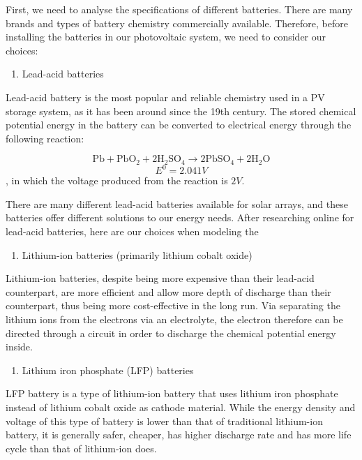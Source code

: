 First, we need to analyse the specifications of different batteries. There are many brands and types of battery chemistry commercially available. Therefore, before installing the batteries in our photovoltaic system, we need to consider our choices:
\begin{enumerate}
    \item Lead-acid batteries
\end{enumerate}
Lead-acid battery is the most popular and reliable chemistry used in a PV storage system, as it has been around since the 19th century. The stored chemical potential energy in the battery can be converted to electrical energy through the following reaction:

$$\mathrm{Pb}+\mathrm{PbO}_{2}+2 \mathrm{H}_{2} \mathrm{SO}_{4} \rightarrow 2 \mathrm{PbSO}_{4}+2 \mathrm{H}_{2} \mathrm{O}$$
$$
E^{0}=2.041 V
$$
, in which the voltage produced from the reaction is $2V$.\cite{wiki:lead_acid_battery}

There are many different lead-acid batteries available for solar arrays, and these batteries offer different solutions to our energy needs. After researching online for lead-acid batteries, here are our choices when modeling the 

\begin{enumerate}[resume]
    \item Lithium-ion batteries (primarily lithium cobalt oxide)
\end{enumerate}
Lithium-ion batteries, despite being more expensive than their lead-acid counterpart, are more efficient and allow more depth of discharge than their counterpart, thus being more cost-effective in the long run. Via separating the lithium ions from the electrons via an electrolyte, the electron therefore can be directed through a circuit in order to discharge the chemical potential energy inside.\cite{wiki:li_ion_battery} \\

\begin{enumerate}[resume]
    \item Lithium iron phosphate (LFP) batteries
\end{enumerate}
LFP battery is a type of lithium-ion battery that uses lithium iron phosphate instead of lithium cobalt oxide as cathode material. While the energy density and voltage of this type of battery is lower than that of traditional lithium-ion battery, it is generally safer, cheaper, has higher discharge rate and has more life cycle than that of lithium-ion does.\cite{wiki:lfp_battery}\\ 

